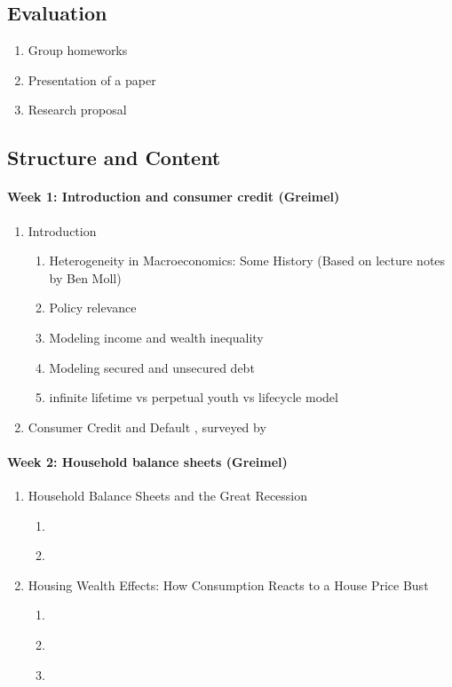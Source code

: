 \documentclass[a4paper,12pt]{article}
\begin{document}
\subsection*{Evaluation}

\begin{enumerate}
\item Group homeworks
\item Presentation of a paper
\item Research proposal
\end{enumerate}

\subsection*{Structure and Content}

\paragraph{Week 1: Introduction and consumer credit (Greimel)}
\begin{enumerate}
\item Introduction
  \begin{enumerate}
  \item Heterogeneity in Macroeconomics: Some History (Based on lecture notes by Ben Moll)
  \item Policy relevance
  \item Modeling income and wealth inequality
  \item Modeling secured and unsecured debt
  \item infinite lifetime vs perpetual youth vs lifecycle model
  \end{enumerate}

\item Consumer Credit and Default \citep{athreya2002welfare,chatterjee2007quantitative,livshits2007consumer}, surveyed by \citet{exler2020consumer}
\end{enumerate}

\paragraph{Week 2: Household balance sheets (Greimel)}

\begin{enumerate}
\item Household Balance Sheets and the Great Recession
  \begin{enumerate}
  \item \cite{mian2013household}
  \item \cite{berger2015consumption}
  \end{enumerate}
\item Housing Wealth Effects: How Consumption Reacts to a House Price Bust
  \begin{enumerate}
  \item \cite{berger2018house}
  \item \cite{guren2021housing}
  \item \cite{greimel2019understanding}
  \end{enumerate}
\end{enumerate}
\end{document}

